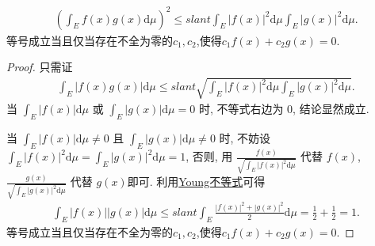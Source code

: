 \documentclass[../../main.tex]{subfiles}
\begin{document}
\begin{theorem}[Cauchy不等式]\label{theorem:Cauchy不等式(一般版本)}
\begin{align*}
\left(\int_E f(x)g(x) \mathrm{d}\mu\right)^2 \leqslant slant \int_E |f(x)|^2 \mathrm{d}\mu \int_E |g(x)|^2 \mathrm{d}\mu.
\end{align*} 
等号成立当且仅当存在不全为零的$c_1,c_2$,使得$c_1f(x)+c_2g(x)=0.$
\end{theorem}
\begin{proof}
只需证
\begin{align*}
\int_E |f(x)g(x)| \mathrm{d}\mu \leqslant slant \sqrt{\int_E |f(x)|^2 \mathrm{d}\mu \int_E |g(x)|^2 \mathrm{d}\mu}.
\end{align*}
当 $\int_E |f(x)| \mathrm{d}\mu$ 或 $\int_E |g(x)| \mathrm{d}\mu = 0$ 时, 不等式右边为 $0$, 结论显然成立.

当 $\int_E |f(x)| \mathrm{d}\mu \ne 0$ 且 $\int_E |g(x)| \mathrm{d}\mu \ne 0$ 时, 不妨设 $\int_E |f(x)|^2 \mathrm{d}\mu = \int_E |g(x)|^2 \mathrm{d}\mu = 1$, 否则, 用 $\frac{f(x)}{\sqrt{\int_E |f(x)|^2 \mathrm{d}\mu}}$ 代替 $f(x)$, $\frac{g(x)}{\sqrt{\int_E |g(x)|^2 \mathrm{d}\mu}}$ 代替 $g(x)$即可.
利用\hyperref[theorem:Young不等式初等形式]{Young不等式}可得
\begin{align*}
\int_E |f(x)||g(x)| \mathrm{d}\mu \leqslant slant \int_E \frac{|f(x)|^2 + |g(x)|^2}{2} \mathrm{d}\mu = \frac{1}{2} + \frac{1}{2} = 1.
\end{align*}
等号成立当且仅当存在不全为零的$c_1,c_2$,使得$c_1f(x)+c_2g(x)=0.$
\end{proof}
\end{document}
